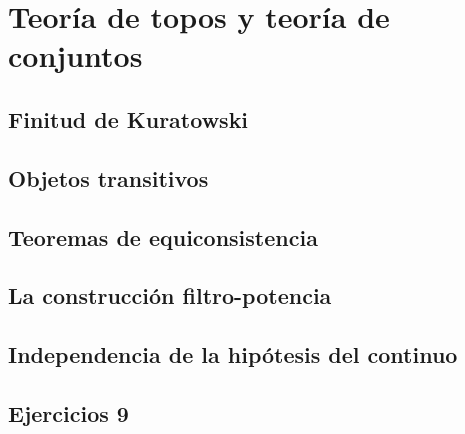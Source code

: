 \chapter{Teoría de topos y teoría de conjuntos}
\label{cap:9}

\section{Finitud de Kuratowski}
\label{sec:9.1}

\section{Objetos transitivos}
\label{sec:9.2}

\section{Teoremas de equiconsistencia}
\label{sec:9.3}

\section{La construcción filtro-potencia}
\label{sec:9.4}

\section{Independencia de la hipótesis del continuo}
\label{sec:9.5}

\section*{Ejercicios 9}
\label{sec:ejercicios-9}
